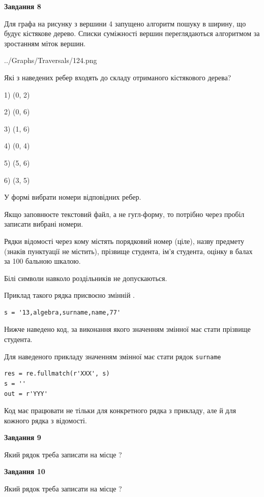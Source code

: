 \documentclass[12pt, ukrainian]{article}
\def\code#1{\Verb!#1!}
\begin{document}
{\begin {large}
{\begin {center}\textbf{Завдання 8}\end {center}}\par
Для графа на рисунку з вершини 4 запущено алгоритм пошуку в ширину, що будує кістякове дерево. Списки суміжності вершин переглядаються алгоритмом за зростанням міток вершин.\par
\begin{center}
	{../Graphs/Traversals/124.png}
\end{center}
\par Які з наведених ребер входять до складу отриманого кістякового дерева?\par
1) (0, 2)\par
2) (0, 6)\par
3) (1, 6)\par
4) (0, 4)\par
5) (5, 6)\par
6) (3, 5)\par
{\vskip 15pt} У формі вибрати номери відповідних ребер.


Якщо заповнюєте текстовий файл, а не гугл-форму, то потрібно через пробіл записа\-ти вибрані номери.\par
\newpage


Рядки відомості через кому містять порядковий номер (ціле), назву предмету (зна\-ків пунктуації не містить), прізвище студента, ім'я студента, оцінку в балах за 100 бальною шкалою.

Білі символи навколо роздільників не допускаються.

Приклад такого рядка присвоєно змінній .



\begin{verbatim}
s = '13,algebra,surname,name,77'
\end{verbatim}


Нижче наведено код, за виконання якого значенням змінної  має стати прізвище студента.

Для наведеного прикладу значенням змінної  має стати рядок \code{surname}



\begin{verbatim}
res = re.fullmatch(r'XXX', s)
s = ''
out = r'YYY'
\end{verbatim}


Код має працювати не тільки для конкретного рядка з прикладу, але й для кожного рядка з відомості.

{\begin {center}\textbf{Завдання 9}\end {center}}\par
Який рядок треба записати на місце  ?\par
\vspace{5mm}


{\begin {center}\textbf{Завдання 10}\end {center}}\par
Який рядок треба записати на місце  ?\par


\newpage


\end {large}}
\end{document}
